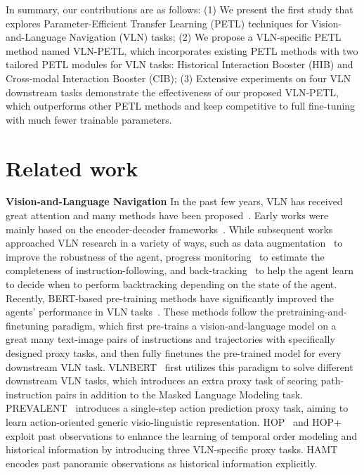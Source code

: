 \documentclass[10pt,twocolumn,letterpaper]{article}
\begin{document}
In summary, our contributions are as follows: (1) We present the first study that explores Parameter-Efficient Transfer Learning (PETL) techniques for Vision-and-Language Navigation (VLN) tasks; 
(2) We propose a VLN-specific PETL method named VLN-PETL, which incorporates existing PETL methods with two tailored PETL modules for VLN tasks: Historical Interaction Booster (HIB) and Cross-modal Interaction Booster (CIB); (3) Extensive experiments on four VLN downstream tasks demonstrate the effectiveness of our proposed VLN-PETL, which outperforms other PETL methods and keep competitive to full fine-tuning with much fewer trainable parameters.
 \section{Related work}
\label{sec:related_work}

\vspace{-3pt}
\noindent\textbf{Vision-and-Language Navigation}
In the past few years, VLN has received great attention and many methods have been proposed~\cite{Hong_2022_CVPR,recurrent,Lin2022ADAPTVN,Lin2021MultimodalTW,orist,oaam}. Early works were mainly based on the encoder-decoder frameworks~\cite{r2r,speakerfollower,selfmonitor}. While subsequent works approached VLN research in a variety of ways, such as data augmentation~\cite{speakerfollower,Li2022EnveditEE,rem} to improve the robustness of the agent, progress monitoring~\cite{selfmonitor,softexp,Zhu0CL20} to estimate the completeness of instruction-following, and back-tracking~\cite{ke2019tactical,regretful} to help the agent learn to decide when to perform backtracking depending on the state of the agent. Recently, BERT-based pre-training methods have significantly improved the agents' performance in VLN tasks~\cite{airbert,press}. These methods follow the pretraining-and-finetuning paradigm, which first pre-trains a vision-and-language model on a great many text-image pairs of instructions and trajectories with specifically designed proxy tasks, and then fully finetunes the pre-trained model for every downstream VLN task.
VLNBERT~\cite{bertvln} first utilizes this paradigm to solve different downstream VLN tasks, which introduces an extra proxy task of scoring path-instruction pairs in addition to the Masked Language Modeling task. 
PREVALENT~\cite{prevalent} introduces a single-step action prediction proxy task, aiming to learn action-oriented generic visio-linguistic representation. 
HOP~\cite{hop} and HOP+~\cite{qiao2023hop+} exploit past observations to enhance the learning of temporal order modeling and historical information by introducing three VLN-specific proxy tasks. 
HAMT~\cite{hamt} encodes past panoramic observations as historical information explicitly. 
\end{document}

